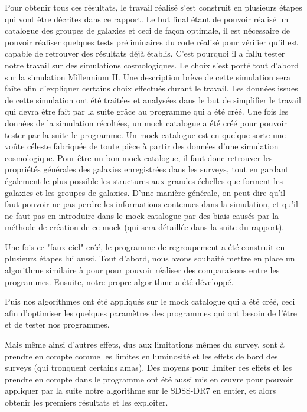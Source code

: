 Pour obtenir tous ces résultats, le travail réalisé s'est construit en plusieurs étapes qui vont être décrites dans ce rapport.
Le but final étant de pouvoir réalisé un catalogue des groupes de galaxies et ceci de façon optimale, il est nécessaire de pouvoir
réaliser quelques tests préliminaires du code réalisé pour vérifier qu'il est capable de retrouver des résultats déjà établis.
C'est pourquoi il a fallu tester notre travail sur des simulations cosmologiques. Le choix s'est porté tout d'abord sur la
simulation Millennium II. Une description brève de cette simulation sera faîte afin d'expliquer certains choix effectués durant le
travail. Les données issues de cette simulation ont été traitées et analysées dans le but de simplifier le travail qui devra être
fait par la suite grâce au programme qui a été créé. Une fois les données de la simulation récoltées, un mock catalogue a été créé
pour pouvoir tester par la suite le programme. Un mock catalogue est en quelque sorte une voûte céleste fabriquée de toute pièce à
partir des données d'une simulation cosmologique. Pour être un bon mock catalogue, il faut donc retrouver les propriétés générales
des galaxies enregistrées dans les surveys, tout en gardant également le plus possible les structures aux grandes échelles que
forment les galaxies et les groupes de galaxies. D'une manière générale, on peut dire qu'il faut pouvoir ne pas perdre les
informations contenues dans la simulation, et qu'il ne faut pas en introduire dans le mock catalogue par des biais causés par la
méthode de création de ce mock (qui sera détaillée dans la suite du rapport).

Une fois ce "faux-ciel" créé, le programme de regroupement a été construit en plusieurs étapes lui aussi. Tout d'abord, nous avons
souhaité mettre en place un algorithme similaire à \citet{Yang+07} pour pour pouvoir réaliser des comparaisons entre les
programmes. Ensuite, notre propre algorithme a été développé.

Puis nos algorithmes ont été appliqués sur le mock catalogue qui a été créé, ceci afin d'optimiser les quelques paramètres des
programmes qui ont besoin de l'être et de tester nos programmes.

Mais même ainsi d'autres effets, dus aux limitations mêmes du survey, sont à prendre en compte comme les limites en luminosité et
les effets de bord des surveys (qui tronquent certains amas). Des moyens pour limiter ces effets et les prendre en compte dans le
programme ont été aussi mis en {\oe}uvre pour pouvoir appliquer par la suite notre algorithme sur le SDSS-DR7 en entier, et alors
obtenir les premiers résultats et les exploiter.

